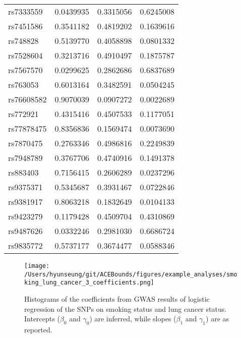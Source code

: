 \documentclass[
]{article}
\theoremstyle{plain}
\begin{document}
\begin{table}[H]
\begin{minipage}{0.5\linewidth}
\begin{table}[H]
\begin{tabular}{lrrr}
\addlinespace
rs7333559 & 0.0439935 & 0.3315056 & 0.6245008\\
rs7451586 & 0.3541182 & 0.4819202 & 0.1639616\\
rs748828 & 0.5139770 & 0.4058898 & 0.0801332\\
rs7528604 & 0.3213716 & 0.4910497 & 0.1875787\\
rs7567570 & 0.0299625 & 0.2862686 & 0.6837689\\
\addlinespace
rs763053 & 0.6013164 & 0.3482591 & 0.0504245\\
rs76608582 & 0.9070039 & 0.0907272 & 0.0022689\\
rs772921 & 0.4315416 & 0.4507533 & 0.1177051\\
rs77878475 & 0.8356836 & 0.1569474 & 0.0073690\\
rs7870475 & 0.2763346 & 0.4986816 & 0.2249839\\
\addlinespace
rs7948789 & 0.3767706 & 0.4740916 & 0.1491378\\
rs883403 & 0.7156415 & 0.2606289 & 0.0237296\\
rs9375371 & 0.5345687 & 0.3931467 & 0.0722846\\
rs9381917 & 0.8063218 & 0.1832649 & 0.0104133\\
rs9423279 & 0.1179428 & 0.4509704 & 0.4310869\\
\addlinespace
rs9487626 & 0.0332246 & 0.2981030 & 0.6686724\\
rs9835772 & 0.5737177 & 0.3674477 & 0.0588346\\
\bottomrule
\end{tabular}
\end{table}


  \end{minipage}
\end{table}

\begin{figure}[H]
  \center
  \texttt{[image: /Users/hyunseung/git/ACEBounds/figures/example\_analyses/smoking\_lung\_cancer\_3\_coefficients.png]}
  \caption{Histograms of the coefficients from GWAS results of logistic regression of the SNPs on smoking status and lung cancer status. Intercepts ($\beta_0$ and $\gamma_0$) are inferred, while slopes ($\beta_1$ and $\gamma_1$) are as reported.}
  \label{fig:marginal-distribution-of-coefficients-lung-cancer}
\end{figure}
\end{document}
